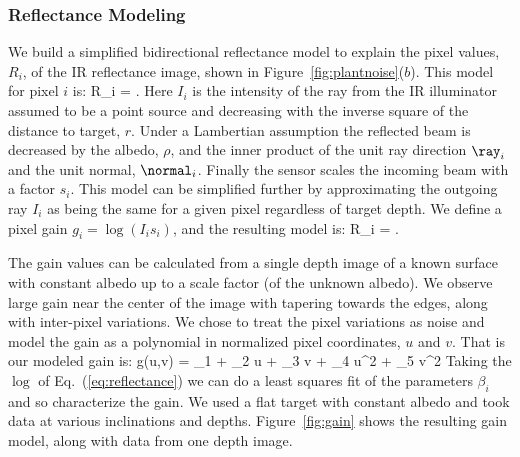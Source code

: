 \subsubsection{Reflectance Modeling}

We build a simplified bidirectional reflectance model to explain the pixel values, $R_i$, of the IR reflectance image, shown in Figure~\ref{fig:plantnoise}($b$).  This model for pixel $i$ is:
\beq
R_i = .\label{eq:reflectanceinit}
\eeq
Here $I_i$ is the intensity of the ray from the IR illuminator assumed to be a point source and decreasing with the inverse square of the distance to target, $r$. Under a Lambertian assumption the reflected beam is decreased by the albedo, $\rho$, and the inner product of the unit ray direction $\ray_i$ and the unit normal, $\normal_i$.  Finally the sensor scales the incoming beam with a factor $s_i$.  This model can be simplified further by approximating the outgoing ray $I_i$ as being the same for a given pixel regardless of target depth.  We define a pixel gain $g_i = \log(I_i s_i)$, and the resulting model is:
\beq
R_i = . \label{eq:reflectance}
\eeq

The gain values can be calculated from a single depth image of a known surface with constant albedo up to a scale factor (of the unknown albedo).  We observe large gain near the center of the image with tapering towards the edges, along with inter-pixel variations.  We chose to treat the pixel variations as noise and model the gain as a polynomial in normalized pixel coordinates, $u$ and $v$.  That is our modeled gain is:
\beq
g(u,v) = \beta_1 + \beta_2 u + \beta_3 v + \beta_4 u^2 + \beta_5 v^2 \label{eq:gainmodel}
\eeq
Taking the $\log$ of Eq.~(\ref{eq:reflectance}) we can do a least squares fit of the parameters $\beta_i$ and so characterize the gain.  We used a flat target with constant albedo and took data at various inclinations and depths. Figure~\ref{fig:gain} shows the resulting gain model, along with data from one depth image.   

